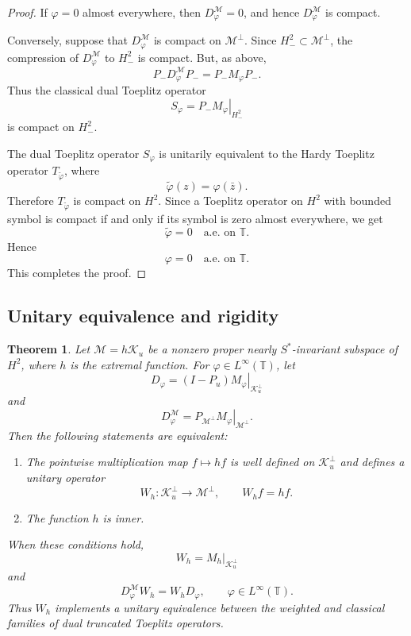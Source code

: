 \documentclass[12pt]{amsart}
\newtheorem{theorem}{Theorem}[section]
\theoremstyle{definition}
\theoremstyle{remark}
\def \T{\mathbb{T}}
\newcommand{\clm}{\mathcal{M}}
\newcommand{\clk}{\mathcal{K}}
\newcommand{\vp}{\varphi}
\newcommand\restr[2]{\ensuremath{\left.#1\right|_{#2}}}
\numberwithin{equation}{section}
\begin{document}
\begin{proof}
If $\vp=0$ almost everywhere, then $D_\vp^\clm=0$, and hence
$D_\vp^\clm$ is compact.

Conversely, suppose that $D_\vp^\clm$ is compact on $\clm^\perp$. Since $H_{-}^2\subset\clm^\perp$, the compression of $D_\vp^\clm$ to $H_{-}^2$ is compact. But, as above,
\[
P_{-}D_\vp^\clm P_{-}
=
P_{-}M_\vp P_{-}.
\]
Thus the classical dual Toeplitz operator
\[
S_\vp=\restr{P_{-}M_\vp}{H_{-}^2}
\]
is compact on $H_{-}^2$.

The dual Toeplitz operator $S_\vp$ is unitarily equivalent to the Hardy
Toeplitz operator $T_{\widetilde{\vp}}$, where
\[
\widetilde{\vp}(z)=\vp(\bar{z}).
\]
Therefore $T_{\widetilde{\vp}}$ is compact on $H^2$. Since a Toeplitz operator on $H^2$ with bounded symbol is compact if and only if its symbol is zero almost everywhere, we get
\[
\widetilde{\vp}=0 \quad \text{a.e. on } \T.
\]
Hence
\[
\vp=0 \quad \text{a.e. on } \T.
\]
This completes the proof.
\end{proof}




\subsection{Unitary equivalence and rigidity}
\begin{theorem}\label{thm:rigidity}
Let $\clm=h\clk_u$ be a nonzero proper nearly $S^*$-invariant subspace
of $H^2$, where $h$ is the extremal function. For
$\vp\in L^\infty(\T)$, let
\[
D_\vp
=
\restr{(I-P_u)M_\vp}{\clk_u^\perp}
\]
and
\[
D_\vp^\clm
=
\restr{P_{\clm^\perp}M_\vp}{\clm^\perp}.
\]
Then the following statements are equivalent:
\begin{enumerate}
\item The pointwise multiplication map $f\mapsto hf$ is well defined on
$\clk_u^\perp$ and defines a unitary operator
\[
W_h:\clk_u^\perp\longrightarrow\clm^\perp,
\qquad
W_hf=hf.
\]
\item The function $h$ is inner.
\end{enumerate}
When these conditions hold,
\[
W_h=\restr{M_h}{\clk_u^\perp}
\]
and
\[
D_\vp^\clm W_h=W_hD_\vp,
\qquad
\vp\in L^\infty(\T).
\]
Thus $W_h$ implements a unitary equivalence between the weighted and
classical families of dual truncated Toeplitz operators.
\end{theorem}
\end{document}
